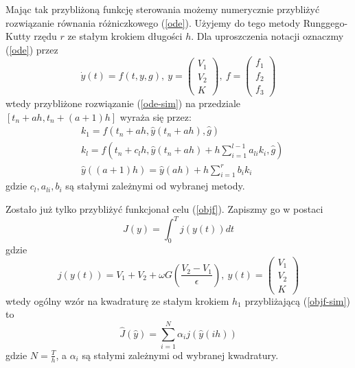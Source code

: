 \documentclass[11pt]{article}
\begin{document}
Mając tak przybliżoną funkcję sterowania możemy numerycznie przybliżyć rozwiązanie równania różniczkowego (\ref{ode}). Użyjemy do tego metody Runggego-Kutty rzędu $r$ ze stałym krokiem długości $h$. Dla uproszczenia notacji oznaczmy (\ref{ode}) przez
\begin{equation} \label{ode-sim}
  \dot{y}(t) = f(t, y, g),\ y = \begin{pmatrix} V_1 \\ V_2 \\ K \end{pmatrix},\ f = \begin{pmatrix} f_1 \\ f_2 \\ f_3 \end{pmatrix}
\end{equation}
wtedy przybliżone rozwiązanie (\ref{ode-sim}) na przedziale $[t_n + ah, t_n + (a + 1)h]$ wyraża się przez:
\begin{equation} \label{rk}
  \begin{split}
    &k_1 = f(t_n + ah, \hat{y}(t_n + ah), \hat{g}) \\
    &k_l = f(t_n + c_l h, \hat{y}(t_n + ah) + h \sum_{i = 1}^{l-1} a_{li}k_i, \hat{g}) \\
    &\hat{y}((a+1)h) = \hat{y}(ah) + h \sum_{i = 1}^r b_i k_i
  \end{split}
\end{equation}
gdzie $c_l, a_{li}, b_i$ są stałymi zależnymi od wybranej metody.

Zostało już tylko przybliżyć funkcjonał celu (\ref{objf}). Zapiszmy go w postaci
\begin{equation} \label{objf-sim}
  J(y) = \int_0^T j(y(t)) dt
\end{equation}
gdzie
\begin{equation}
  j(y(t)) = V_1 + V_2 + \omega G\left(\frac{V_2 - V_1}{\epsilon} \right),\ y(t) = \begin{pmatrix} V_1 \\ V_2 \\ K \end{pmatrix}
\end{equation}
wtedy ogólny wzór na kwadraturę ze stałym krokiem $h_1$ przybliżającą (\ref{objf-sim}) to
\begin{equation} \label{quad}
  \hat{J}(\hat{y}) = \sum_{i = 1}^N \alpha_i j(\hat{y}(ih))
\end{equation}
gdzie $N = \frac{T}{h}$, a $\alpha_i$ są stałymi zależnymi od wybranej kwadratury.
\end{document}
